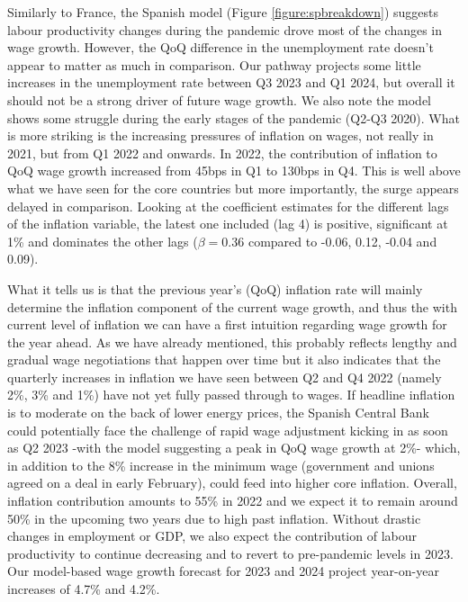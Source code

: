 Similarly to France, the Spanish model (Figure \ref{figure:spbreakdown}) suggests labour productivity changes during the pandemic drove most of the changes in wage growth. 
However, the QoQ difference in the unemployment rate doesn’t appear to matter as much in comparison. 
Our pathway projects some little increases in the unemployment rate between Q3 2023 and Q1 2024, but overall it should not be a strong driver of future wage growth. 
We also note the model shows some struggle during the early stages of the pandemic (Q2-Q3 2020). 
What is more striking is the increasing pressures of inflation on wages, not really in 2021, but from Q1 2022 and onwards. 
In 2022, the contribution of inflation to QoQ wage growth increased from 45bps in Q1 to 130bps in Q4. 
This is well above what we have seen for the core countries but more importantly, the surge appears delayed in comparison. 
Looking at the coefficient estimates for the different lags of the inflation variable, the latest one included (lag 4) is positive, significant at 1\% and dominates the other lags ($\beta = 0.36$ compared to -0.06, 0.12, -0.04 and 0.09). 

What it tells us is that the previous year's (QoQ) inflation rate will mainly determine the inflation component of the current wage growth, and thus the with current level of inflation we can have a first intuition regarding wage growth for the year ahead. 
As we have already mentioned, this probably reflects lengthy and gradual wage negotiations that happen over time but it also indicates that the quarterly increases in inflation we have seen between Q2 and Q4 2022 (namely 2\%, 3\% and 1\%) have not yet fully passed through to wages. 
If headline inflation is to moderate on the back of lower energy prices, the Spanish Central Bank could potentially face the challenge of rapid wage adjustment kicking in as soon as Q2 2023 -with the model suggesting a peak in QoQ wage growth at 2\%- which, in addition to the 8\% increase in the minimum wage (government and unions agreed on a deal in early February), could feed into higher core inflation. 
Overall, inflation contribution amounts to 55\% in 2022 and we expect it to remain around 50\% in the upcoming two years due to high past inflation. 
Without drastic changes in employment or GDP, we also expect the contribution of labour productivity to continue decreasing and to revert to pre-pandemic levels in 2023. 
Our model-based wage growth forecast for 2023 and 2024 project year-on-year increases of 4.7\% and 4.2\%.

